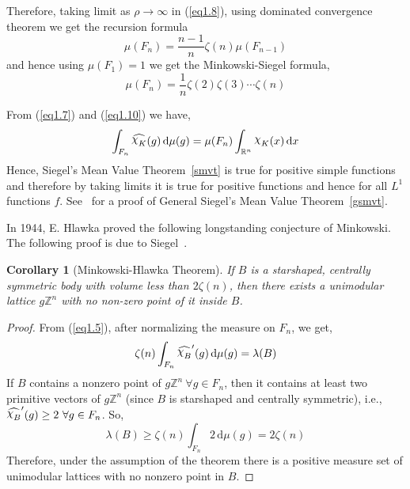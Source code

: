 \documentclass[11pt]{article}
\newtheorem{corollary}[theorem]{Corollary}
\theoremstyle{definition}
\newcommand{\mychi}{\raisebox{2pt}{$\chi$}}
\begin{document}
Therefore, taking limit as $\rho \to \infty$ in (\ref{eq1.8}), using dominated convergence theorem we get the recursion formula
\begin{equation}\label{eq1.10}
    \mu (F_n)= \frac{n-1}{n} \zeta (n) \mu (F_{n-1})
\end{equation}
and hence using $ \mu (F_1) = 1$ we get the Minkowski-Siegel formula,
\begin{equation*}
    \mu (F_n) = \frac{1}{n}\zeta (2) \zeta (3) \cdots \zeta (n)
\end{equation*}

\vspace{2em}
From (\ref{eq1.7}) and (\ref{eq1.10}) we have,
\[
    \int_{F_n} \widehat{\mychi _{K}} (g) \, \mathrm{d} \mu (g) = \mu(F_n) \int_{\mathbb{R}^n } \mychi _K(x) \, \mathrm{d} x
\]
Hence, Siegel's Mean Value Theorem~\ref{smvt} is true for positive simple functions and therefore by taking limits it is true for positive functions and hence for all $L^1 $ functions $f$.
See~\cite{macbeathrogers58} for a proof of General Siegel's Mean Value Theorem~\ref{gsmvt}.

In 1944, E. Hlawka proved the following longstanding conjecture of Minkowski.
The following proof is due to Siegel~\cite{siegel45}.
\begin{corollary}[Minkowski-Hlawka Theorem]\label{cor2}
    If $B$ is a starshaped,  centrally symmetric body with volume less than $2 \zeta (n)$, then there exists a unimodular lattice $g \mathbb{Z}^n$ with no non-zero point of it inside $B$.
\end{corollary}
\begin{proof}
    From (\ref{eq1.5}), after normalizing the measure on $F_n$, we get,
    \begin{equation}\label{eq1.11}
        \zeta (n) \int_{F_n}\widehat{\mychi _{B}}'(g) \, \mathrm{d} \mu (g ) = \lambda (B)
    \end{equation}
    If $B$ contains a nonzero point of $g\mathbb{Z}^n \ \forall g \in F_n$, then it contains at least two primitive vectors of $g\mathbb{Z}^n$ (since $B$ is starshaped and centrally symmetric), i.e., $\widehat{\mychi _{B}}'(g) \ge 2 \ \forall g \in F_n$.
    So,
    \[	
        \lambda (B) \ge \zeta(n) \int_{F_n}2 \, \mathrm{d} \mu (g) = 2 \zeta (n)
    \]
    Therefore, under the assumption of the theorem there is a positive measure set of unimodular lattices with no nonzero point in $B$.
\end{proof}
\end{document}
